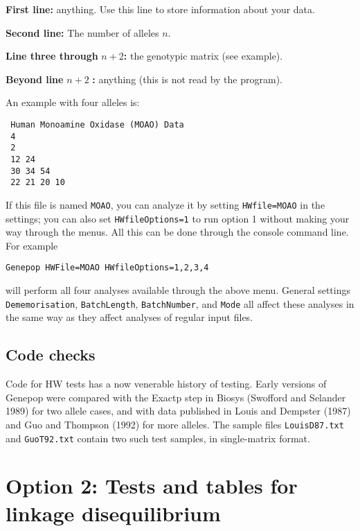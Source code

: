 \documentclass[
  12pt,
]{book}
\begin{document}
\textbf{First line:} anything. Use this line to store information about your data.

\textbf{Second line:} The number of alleles \(n\).

\textbf{Line three through} \(n+2\)\textbf{:} the genotypic matrix (see example).

\textbf{Beyond line} \(n+2\) \textbf{:} anything (this is not read by the program).

An example with four alleles is:

\begin{verbatim}
 Human Monoamine Oxidase (MOAO) Data
 4
 2
 12 24
 30 34 54
 22 21 20 10
\end{verbatim}

If this file is named \texttt{MOAO}, you can analyze it by setting \texttt{HWfile=MOAO} in the settings; you can also set \texttt{HWfileOptions=1} to run option 1 without making your way through the menus. All this can be done through the console command line. For example

\begin{verbatim}
Genepop HWFile=MOAO HWfileOptions=1,2,3,4
\end{verbatim}

will perform all four analyses available through the above menu. General settings \texttt{Dememorisation}, \texttt{BatchLength}, \texttt{BatchNumber}, and \texttt{Mode} all affect these analyses in the same way as they affect analyses of regular input files.

\hypertarget{code-checks}{%
\subsection{Code checks}\label{code-checks}}

Code for HW tests has a now venerable history of testing. Early versions of Genepop were compared with the Exactp step in Biosys (Swofford and Selander 1989) for two allele cases, and with data published in Louis and Dempster (1987) and Guo and Thompson (1992) for more alleles. The sample files \texttt{LouisD87.txt} and \texttt{GuoT92.txt} contain two such test samples, in single-matrix format.

\hypertarget{option-2-tests-and-tables-for-linkage-disequilibrium}{%
\section{Option 2: Tests and tables for linkage disequilibrium}\label{option-2-tests-and-tables-for-linkage-disequilibrium}}
\end{document}
